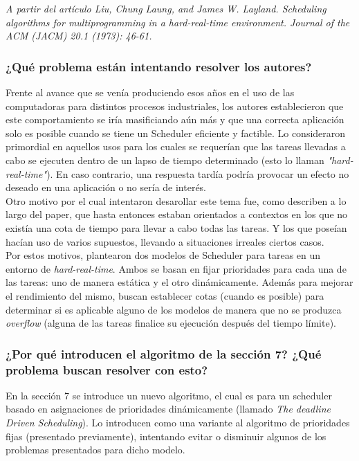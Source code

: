 \documentclass[a4paper]{article}
\begin{document}
\textit{A partir del art\'iculo Liu, Chung Laung, and James W. Layland. Scheduling algorithms for multiprogramming in a hard-real-time environment. Journal of the ACM (JACM) 20.1 (1973): 46-61.}


\subsubsection{¿Qu\'e problema est\'an intentando resolver los autores?}

Frente al avance que se ven\'ia produciendo esos años en el uso de las computadoras para distintos procesos industriales, los autores establecieron que este comportamiento se iría masificiando aún más y que una correcta aplicación solo es posible cuando se tiene un Scheduler eficiente y factible. Lo consideraron primordial en aquellos usos para los cuales se requerían que las tareas llevadas a cabo se ejecuten dentro de un lapso de tiempo determinado (esto lo llaman \textit{"hard-real-time"}). En caso contrario, una respuesta tardía podría provocar un efecto no deseado en una aplicación o no sería de interés. \\

Otro motivo por el cual intentaron desarollar este tema fue, como describen a lo largo del paper, que hasta entonces estaban orientados a contextos en los que no exist\'ia una cota de tiempo para llevar a cabo todas las tareas. Y los que pose\'ian hacían uso de varios supuestos, llevando a situaciones irreales ciertos casos. \\

Por estos motivos, plantearon dos modelos de Scheduler para tareas en un entorno de \textit{hard-real-time}. Ambos se basan en fijar prioridades para cada una de las tareas: uno de manera estática y el otro dinámicamente. Además para mejorar el rendimiento del mismo, buscan establecer cotas (cuando es posible) para determinar si es aplicable alguno de los modelos de manera que no se produzca \textit{overflow} (alguna de las tareas finalice su ejecución después del tiempo límite).


\subsubsection{¿Por qu\'e introducen el algoritmo de la secci\'on 7? ¿Qu\'e problema buscan resolver con esto?}
En la sección 7 se introduce un nuevo algoritmo, el cual es para un scheduler basado en asignaciones de prioridades dinámicamente (llamado \textit{The deadline Driven Scheduling}). Lo introducen como una variante al algoritmo de prioridades fijas (presentado previamente), intentando evitar o disminuir algunos de los problemas presentados para dicho modelo. \\
\end{document}
